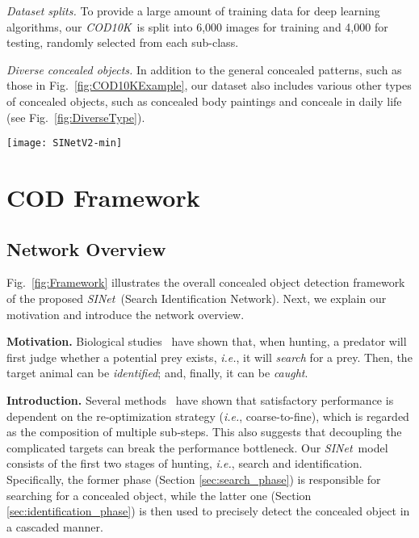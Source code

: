 \documentclass[10pt,journal,compsoc]{IEEEtran}
\def\ie{\emph{i.e.}}
\newcommand{\myPara}[1]{\vspace{6pt}\noindent\textbf{#1}\qquad }
\newcommand{\figref}[1]{Fig.~\ref{#1}}
\newcommand{\secref}[1]{Section \ref{#1}}
\def\ourdataset{\textit{COD10K}}
\def\ournewmodel{\emph{SINet}}
\begin{document}
 \emph{Dataset splits.}
To provide a large amount of training data for deep learning algorithms, 
our \ourdataset~is split into 6,000 images for training and 4,000 for testing, 
randomly selected from each sub-class.

 \emph{Diverse concealed objects.}
In addition to the general concealed patterns, such as those in
\figref{fig:COD10KExample}, our dataset also includes various 
other types of concealed objects, such as
concealed body paintings and conceale in daily life 
(see \figref{fig:DiverseType}).


\begin{figure*}[t!]
  \centering
  \texttt{[image: SINetV2-min]}\\
  \vspace{-12pt}
  \caption{\textbf{Pipeline of our~\ournewmodel~framework}. 
    It consists of three main components: the texture enhanced module (TEM), 
    neighbor connection decoder (NCD), and group-reversal attention (GRA).
The TEM is introduced to mimic the textural structure of receptive fields 
    in the human visual system.
The NCD is responsible for locating the candidates with the assistance 
    of the TEM.
    The GRA blocks reproduce the identification stages of animal predation. 
    Note that  = .
  }\label{fig:Framework}
\end{figure*}


\section{COD Framework}\label{sec:ourmodel}

\subsection{Network Overview}
\figref{fig:Framework} illustrates the overall concealed object detection 
framework of the proposed \ournewmodel~(Search Identification Network). 
Next, we explain our motivation and introduce the network overview.

\myPara{Motivation.}
Biological studies~\cite{hall2013camouflage} have shown that, when hunting, 
a predator will first judge whether a potential prey exists, \ie, 
it will \emph{search} for a prey.
Then, the target animal can be \emph{identified}; and, finally, 
it can be \emph{caught}.


\myPara{Introduction.}
Several methods~\cite{qin2019basnet,xu2017deep} have shown that satisfactory 
performance is dependent on the re-optimization strategy (\ie, coarse-to-fine), 
which is regarded as the composition of multiple sub-steps.
This also suggests that decoupling the complicated targets can break the
performance bottleneck.
Our \ournewmodel~model consists of the first two stages of hunting, 
\ie, search and identification.
Specifically, the former phase (\secref{sec:search_phase}) is responsible for 
searching for a concealed object, 
while the latter one (\secref{sec:identification_phase}) is then 
used to precisely detect the concealed object in a cascaded manner.
\end{document}

